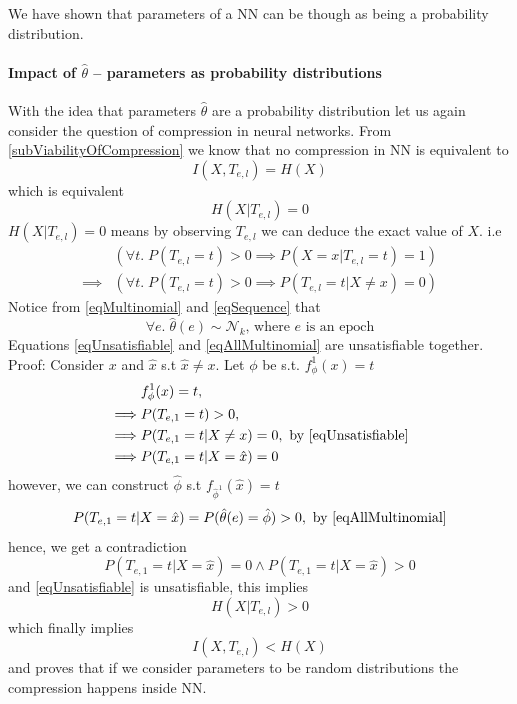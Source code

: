 \documentclass[dissertation.tex]{subfiles}
\begin{document}
We have shown that parameters of a NN can be though as being a probability
distribution.

\paragraph{Impact of $\hat\theta$ -- parameters as probability distributions}
With the idea that parameters $\hat\theta$ are a probability distribution let us
again consider the question of compression in neural networks. From
\autoref{subViabilityOfCompression} we know that no compression in NN is
equivalent to 
\begin{equation*} 
  I(X, T_{e,l}) = H(X)
\end{equation*}
which is equivalent 
\begin{equation*} 
  H(X|T_{e,l}) = 0
\end{equation*}
$H(X|T_{e,l}) = 0$ means by observing $T_{e,l}$ we can deduce the exact value of
$X$. i.e
\begin{align} 
  &(\forall{t}.\;P(T_{e,l}=t)>0 \implies P(X=x|T_{e,l}=t)=1)
  \nonumber\\\implies
  &(\forall{t}.\;P(T_{e,l}=t)>0 \implies P(T_{e,l}=t|X\neq{x})=0)
  \label{eqUnsatisfiable}
\end{align}
Notice from \autoref{eqMultinomial} and \autoref{eqSequence} that 
\begin{equation} 
  \forall{e}.\;\hat\theta(e)\sim\mathcal{N}_k
  \text{, where }e\text{ is an epoch}
  \label{eqAllMultinomial}
\end{equation}
Equations \ref{eqUnsatisfiable} and \ref{eqAllMultinomial} are unsatisfiable
together. Proof:
Consider $x$ and $\hat{x}$ s.t $\hat{x}\neq{x}$.
Let $\phi$ be s.t. $f_\phi^1(x)=t$
\begin{align}
  &f_\phi^1(x)=t,
  \nonumber \\ \implies&
  P(T_{e,1}=t)>0,
  \nonumber \\ \implies&
  P(T_{e,1}=t|X\neq{x})=0, \text{ by \autoref{eqUnsatisfiable}}
  \nonumber \\ \implies&
  P(T_{e,1}=t|X=\hat{x})=0
\end{align}
however, we can construct $\hat\phi$ s.t $f_{\hat\phi^1}(\hat{x})=t$
\begin{equation}
  P(T_{e,1}=t|X=\hat{x})=
  P(\hat\theta(e)=\hat\phi) > 0, \text{ by \autoref{eqAllMultinomial}}
\end{equation}
hence, we get a contradiction 
\begin{equation}
  P(T_{e,1}=t|X=\hat{x})=0\land
  P(T_{e,1}=t|X=\hat{x})>0
\end{equation}
and \autoref{eqUnsatisfiable} is unsatisfiable, this implies
\begin{equation}
  H(X|T_{e,l}) > 0
\end{equation}
which finally implies 
\begin{equation*} 
  I(X, T_{e,l}) < H(X)
\end{equation*}
and proves that if we consider parameters to be random distributions the
compression happens inside NN.
\end{document}
